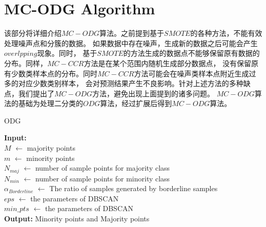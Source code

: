 \documentclass{article}
\begin{document}
\section{MC-ODG Algorithm}
该部分将详细介绍$MC-ODG$算法。之前提到基于$SMOTE$的各种方法，不能有效处理噪声点和分簇的数据。
如果数据中存在噪声，生成新的数据之后可能会产生$overlpping$现象。同时，
基于$SMOTE$的方法生成的数据点不能够保留原有数据的分布。同样，$MC-CCR$方法是在某个范围内随机生成部分数据点，
没有保留原有少数类样本点的分布。同时$MC-CCR$方法可能会在噪声类样本点附近生成过多的对应少数类别样本，
会对预测结果产生不良影响。针对上述方法的多种缺点，我们提出了$MC-ODG$方法，避免出现上面提到的诸多问题。
$MC-ODG$算法的基础为处理二分类的$ODG$算法，经过扩展后得到$MC-ODG$算法。
\begin{algorithm}[t]
  \caption{ODG} %
  \label{alg1}
  \hspace*{0.02in} {\bf Input:} %
   \\$M$ $\leftarrow$ majority points  \\
   $m$ $\leftarrow$ minority points  \\
   $N_{maj}$ $\leftarrow$ number of sample points for majority class  \\
   $N_{min}$ $\leftarrow$ number of sample points for minority class  \\
   $\alpha_{Borderline}$ $\leftarrow$ The ratio of samples generated by borderline samples\\
   $eps$ $\leftarrow$ the parameters of DBSCAN \\
   $min\_pts$ $\leftarrow$ the parameters of DBSCAN \\
   
  \hspace*{0.02in} {\bf Output:} %
  Minority points and Majority points


\end{algorithm}
\end{document}
